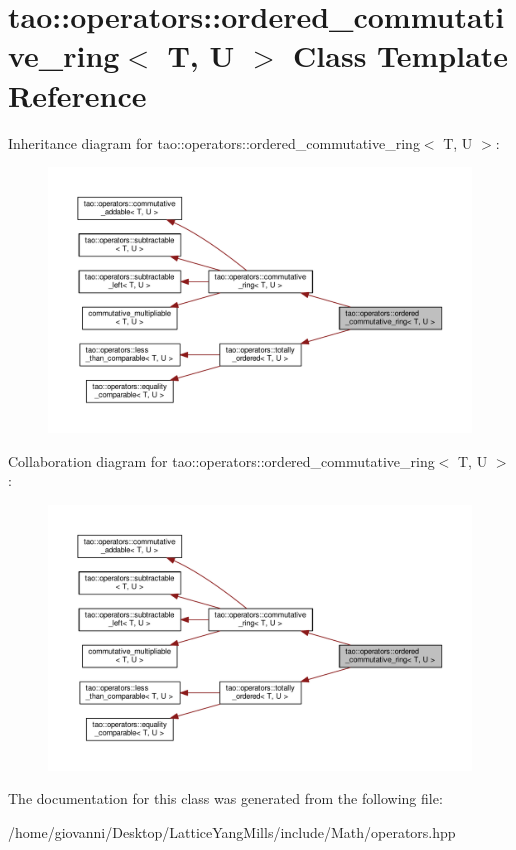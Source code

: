 \hypertarget{classtao_1_1operators_1_1ordered__commutative__ring}{}\section{tao\+:\+:operators\+:\+:ordered\+\_\+commutative\+\_\+ring$<$ T, U $>$ Class Template Reference}
\label{classtao_1_1operators_1_1ordered__commutative__ring}


Inheritance diagram for tao\+:\+:operators\+:\+:ordered\+\_\+commutative\+\_\+ring$<$ T, U $>$\+:\nopagebreak
\begin{figure}[H]
\begin{center}
\leavevmode
\includegraphics[width=350pt]{classtao_1_1operators_1_1ordered__commutative__ring__inherit__graph}
\end{center}
\end{figure}


Collaboration diagram for tao\+:\+:operators\+:\+:ordered\+\_\+commutative\+\_\+ring$<$ T, U $>$\+:\nopagebreak
\begin{figure}[H]
\begin{center}
\leavevmode
\includegraphics[width=350pt]{classtao_1_1operators_1_1ordered__commutative__ring__coll__graph}
\end{center}
\end{figure}


The documentation for this class was generated from the following file\+:\begin{DoxyCompactItemize}
\item 
/home/giovanni/\+Desktop/\+Lattice\+Yang\+Mills/include/\+Math/operators.\+hpp\end{DoxyCompactItemize}
